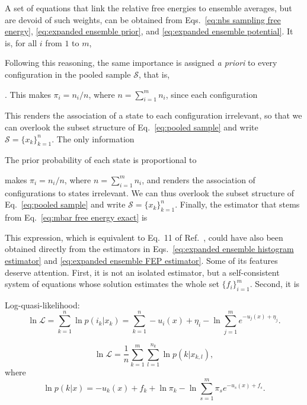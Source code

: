 \documentclass[aip,jcp,reprint,amsmath,amssymb]{revtex4-1}
\begin{document}
A set of equations that link the relative free energies to ensemble averages, but are devoid of such weights, can be obtained from Eqs.~\eqref{eq:nbs sampling free energy}, \eqref{eq:expanded ensemble prior}, and \eqref{eq:expanded ensemble potential}. It is, for all $i$ from $1$ to $m$,





Following this reasoning, the same importance is assigned \textit{a priori} to every configuration in the pooled sample $\mathcal S$, that is, 


. This makes $\pi_i = n_i/n$, where $n = \sum_{i=1}^m n_i$, since each configuration 



This renders the association of a state to each configuration irrelevant, so that we can overlook the subset structure of Eq.~\eqref{eq:pooled sample} and write $\mathcal S = \{x_k\}_{k=1}^n$. The only information 

The prior probability of each state is proportional to 

makes $\pi_i = n_i/n$, where $n = \sum_{i=1}^m n_i$, and renders the association of configurations to states irrelevant. We can thus overlook the subset structure of Eq.~\eqref{eq:pooled sample} and write $\mathcal S = \{x_k\}_{k=1}^n$. Finally, the estimator that stems from Eq.~\eqref{eq:mbar free energy exact} is

This expression, which is equivalent to Eq.~11 of Ref.~, could have also been obtained directly from the estimators in Eqs.~\eqref{eq:expanded ensemble histogram estimator} and \eqref{eq:expanded ensemble FEP estimator}. Some of its features deserve attention. First, it is not an isolated estimator, but a self-consistent system of equations whose solution estimates the whole set $\{f_i\}_{i=1}^m$. Second, it is 

Log-quasi-likelihood:\cite{Geyer_1994}
\begin{equation*}
\ln \mathcal L = \sum_{k=1}^n \ln p(i_k|x_k) = \sum_{k=1}^n -u_i(x) + \eta_i - \ln \sum_{j=1}^m e^{-u_j(x) + \eta_j}.
\end{equation*}

\begin{equation}
\label{eq:mbar log quasi-likelihood}
\ln \mathcal L = \frac{1}{n} \sum_{k=1}^m \sum_{l=1}^{n_k} \ln p(k|x_{k,l}),
\end{equation}
where
\begin{equation*}
\ln p(k|x) = -u_k(x) + f_k + \ln \pi_k - \ln \sum_{s=1}^m \pi_s e^{-u_s(x) + f_s}.
\end{equation*}
\end{document}
